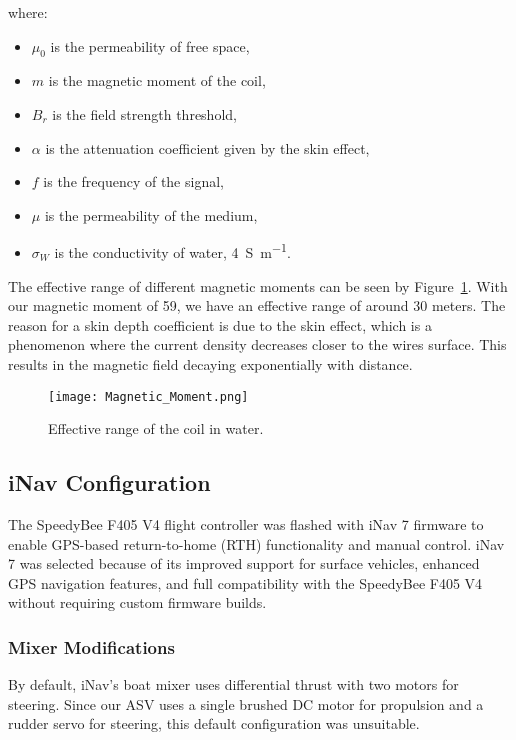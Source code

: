where:
\begin{itemize}
    \item \( \mu_0 \) is the permeability of free space,
    \item \( m \) is the magnetic moment of the coil,
    \item \( B_r \) is the field strength threshold,
    \item \( \alpha \) is the attenuation coefficient given by the skin effect,
    \item \( f \) is the frequency of the signal,
    \item \( \mu \) is the permeability of the medium,
    \item \( \sigma_W \) is the conductivity of water, \SI{4 }{\siemens \per \meter}.
\end{itemize}

The effective range of different magnetic moments can be seen by Figure~\ref{fig:Effective Range}. With our magnetic moment of 59, we have an effective range of around 30 meters. The reason for a skin depth coefficient is due to the skin effect, which is a phenomenon where the current density decreases closer to the wires surface. This results in the magnetic field decaying exponentially with distance. 
\begin{figure}[H]
    \centering
    \texttt{[image: Magnetic\_Moment.png]}
    \caption{Effective range of the coil in water.}
\label{fig:Effective Range}
\end{figure}
\subsection{iNav Configuration}

The SpeedyBee F405 V4 flight controller was flashed with iNav 7 firmware to enable GPS-based return-to-home (RTH) functionality and manual control. iNav 7 was selected because of its improved support for surface vehicles, enhanced GPS navigation features, and full compatibility with the SpeedyBee F405 V4 without requiring custom firmware builds.

\subsubsection*{Mixer Modifications}

By default, iNav's boat mixer uses differential thrust with two motors for steering. Since our ASV uses a single brushed DC motor for propulsion and a rudder servo for steering, this default configuration was unsuitable.

